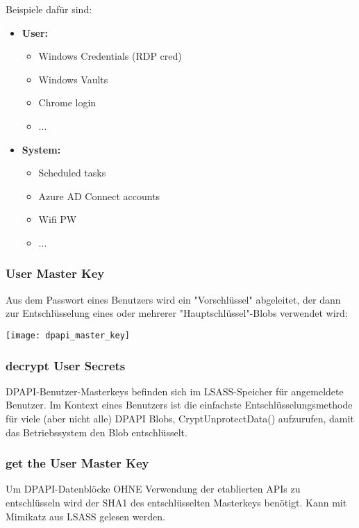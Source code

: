 Beispiele dafür sind:
\begin{itemize}
    \item \textbf{User:}
    \begin{itemize}
        \item Windows Credentials (RDP cred)
        \item Windows Vaults
        \item Chrome login
        \item ...
    \end{itemize}
    \item \textbf{System:}
    \begin{itemize}
        \item Scheduled tasks
        \item Azure AD Connect accounts
        \item Wifi PW
        \item ...
    \end{itemize}
\end{itemize}
\subsubsection{User Master Key}
Aus dem Passwort eines Benutzers wird ein "Vorschlüssel" abgeleitet, der dann zur Entschlüsselung eines oder mehrerer "Hauptschlüssel"-Blobs verwendet wird:
\begin{center}
    \vspace{-8pt}
    \texttt{[image: dpapi\_master\_key]}
    \vspace{-8pt}
\end{center}

\subsubsection{decrypt User Secrets}
DPAPI-Benutzer-Masterkeys befinden sich im LSASS-Speicher für angemeldete Benutzer. Im Kontext eines Benutzers ist die einfachste Entschlüsselungsmethode für viele (aber nicht alle) DPAPI Blobs, CryptUnprotectData() aufzurufen, damit das Betriebssystem den Blob entschlüsselt.

\subsubsection{get the User Master Key}
Um DPAPI-Datenblöcke OHNE Verwendung der etablierten APIs zu entschlüsseln wird der SHA1 des entschlüsselten Masterkeys benötigt. Kann mit Mimikatz aus LSASS gelesen werden.

